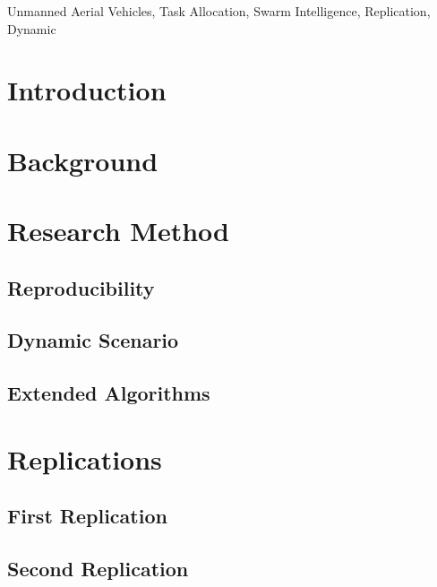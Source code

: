 \documentclass[review]{elsarticle}
\begin{document}
\begin{frontmatter}
\begin{keyword}
Unmanned Aerial Vehicles, Task Allocation, Swarm Intelligence, Replication, Dynamic
\end{keyword}

\end{frontmatter}


\section{Introduction} \label{sec:introduction}


\section{Background}\label{sec:background}


\section{Research Method}\label{sec:method}


\subsection{Reproducibility}\label{sec:reproducibility}


\subsection{Dynamic Scenario}\label{sec:dynamic_scenario}


\subsection{Extended Algorithms}\label{sec:changes}


\section{Replications}\label{sec:replications}


\subsection{First Replication}\label{sec:original}


\subsection{Second Replication}\label{sec:replication}

\end{document}

